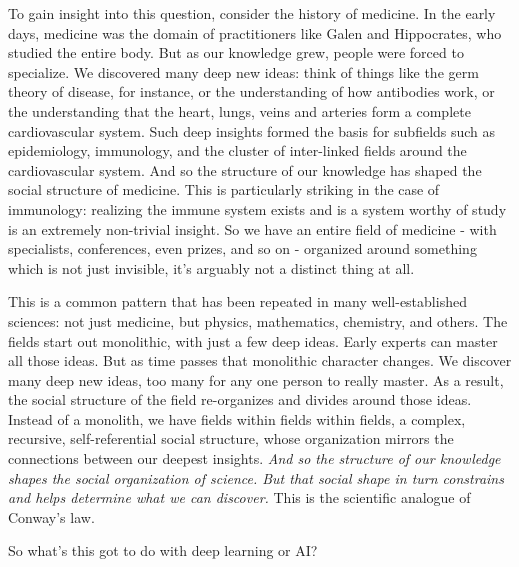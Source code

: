 To gain insight into this question, consider the history of medicine. In the early days, medicine was the domain of practitioners like Galen and Hippocrates, who studied the entire body. But as our knowledge grew, people were forced to specialize. We discovered many deep new ideas: think of things like the germ theory of disease, for instance, or the understanding of how antibodies work, or the understanding that the heart, lungs, veins and arteries form a complete cardiovascular system. Such deep insights formed the basis for subfields such as epidemiology, immunology, and the cluster of inter-linked fields around the cardiovascular system. And so the structure of our knowledge has shaped the social structure of medicine. This is particularly striking in the case of immunology: realizing the immune system exists and is a system worthy of study is an extremely non-trivial insight. So we have an entire field of medicine - with specialists, conferences, even prizes, and so on - organized around something which is not just invisible, it's arguably not a distinct thing at all.

This is a common pattern that has been repeated in many well-established sciences: not just medicine, but physics, mathematics, chemistry, and others. The fields start out monolithic, with just a few deep ideas. Early experts can master all those ideas. But as time passes that monolithic character changes. We discover many deep new ideas, too many for any one person to really master. As a result, the social structure of the field re-organizes and divides around those ideas. Instead of a monolith, we have fields within fields within fields, a complex, recursive, self-referential social structure, whose organization mirrors the connections between our deepest insights. \textit{And so the structure of our knowledge shapes the social organization of science. But that social shape in turn constrains and helps determine what we can discover.} This is the scientific analogue of Conway's law. 

So what's this got to do with deep learning or AI?

